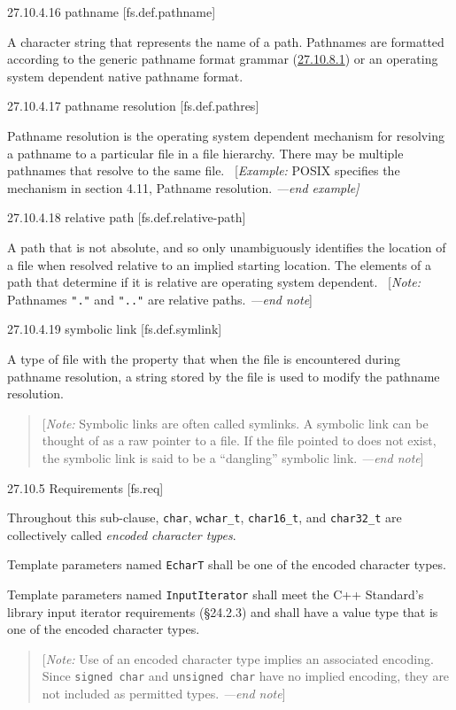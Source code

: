 27.10.4.16 pathname {[}fs.def.pathname{]}

A character string that represents the name of a path. Pathnames are
formatted according to the generic pathname format grammar
(\hyperref[path.generic]{27.10.8.1}) or an operating system dependent
native pathname format.

27.10.4.17 pathname resolution {[}fs.def.pathres{]}

Pathname resolution is the operating system dependent mechanism for
resolving a pathname to a particular file in a file hierarchy. There may
be multiple pathnames that resolve to the same file.~ {[}\emph{Example:}
POSIX specifies the mechanism in section 4.11, Pathname resolution.
\emph{---end example{]}}

27.10.4.18 relative path {[}fs.def.relative-path{]}

A path that is not absolute, and so only unambiguously identifies the
location of a file when resolved relative to an implied starting
location. The elements of a path that determine if it is relative are
operating system dependent.~ {[}\emph{Note:} Pathnames \texttt{"."} and
\texttt{".."} are relative paths. \emph{---end note}{]}

27.10.4.19 symbolic link {[}fs.def.symlink{]}

A type of file with the property that when the file is encountered
during pathname resolution, a string stored by the file is used to
modify the pathname resolution.

\begin{quote}
{[}\emph{Note:} Symbolic links are often called symlinks. A symbolic
link can be thought of as a raw pointer to a file. If the file pointed
to does not exist, the symbolic link is said to be a ``dangling''
symbolic link. \emph{---end note}{]} \emph{}
\end{quote}

27.10.5 Requirements {[}fs.req{]}

Throughout this sub-clause, \texttt{char}, \texttt{wchar\_t},
\texttt{char16\_t}, and \texttt{char32\_t} are collectively called
\emph{encoded character types}.

Template parameters named \texttt{EcharT} shall be one of the encoded
character types.

Template parameters named \texttt{InputIterator} shall meet the C++
Standard's library input iterator requirements (§24.2.3) and shall have
a value type that is one of the encoded character types.

\begin{quote}
{[}\emph{Note:} Use of an encoded character type implies an associated
encoding. Since \texttt{signed\ char} and \texttt{unsigned\ char} have
no implied encoding, they are not included as permitted types.
\emph{---end note}{]}
\end{quote}

